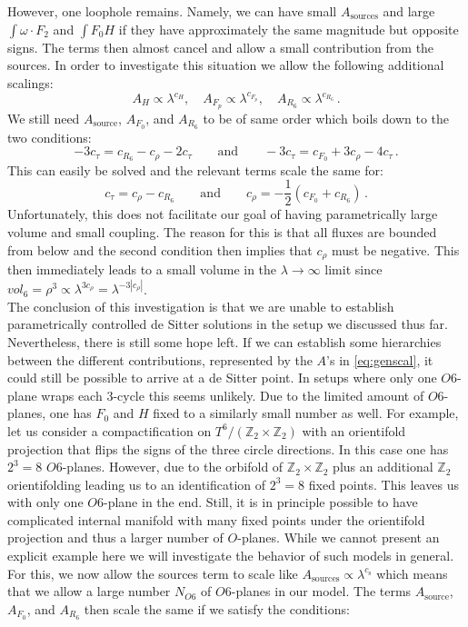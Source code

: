\documentclass[12pt]{report}
\newcommand{\be}{\begin{equation}}
\newcommand{\ee}{\end{equation}}
\begin{document}
However, one loophole remains. Namely, we can have small $A_{\text{sources}}$ and large $\int \omega \cdot F_2$ and $\int F_0 H$ if they have approximately the same magnitude but opposite signs. The terms then almost cancel and allow a small contribution from the sources. In order to investigate this situation we allow the following additional scalings:
\be 
A_H \propto \lambda^ {c_H}, \quad A_{F_p} \propto \lambda^ {c_{F_p}},\quad A_{R_6} \propto \lambda^ {c_{R_6}}\,.
\ee
We still need $A_{\text{source}}$, $A_{F_0}$, and $A_{R_6}$ to be of same order which boils down to the two conditions:
\be 
-3 c_\tau = c_{R_6} - c_\rho - 2 c_\tau \qquad \text{and} \qquad -3c_\tau = c_{F_0} + 3 c_\rho - 4 c_\tau\,.
\ee
This can easily be solved and the relevant terms scale the same for:
\be 
c_\tau = c_\rho - c_{R_6} \qquad \text{and} \qquad c_\rho = -\frac{1}{2} \left( c_{F_0} + c_{R_6} \right)\,.
\ee
Unfortunately, this does not facilitate our goal of having parametrically large volume and small coupling. The reason for this is that all fluxes are bounded from below and the second condition then implies that $c_\rho$ must be negative. This then immediately leads to a small volume in the $\lambda \to \infty$ limit since $vol_6 = \rho^ 3 \propto \lambda^ {3 c_\rho} = \lambda^ {-3 |c_\rho|}$.\\
The conclusion of this investigation is that we are unable to establish parametrically controlled de Sitter solutions in the setup we discussed thus far. Nevertheless, there is still some hope left. If we can establish some hierarchies between the different contributions, represented by the $A$'s in \eqref{eq:genscal}, it could still be possible to arrive at a de Sitter point. In setups where only one $O6$-plane wraps each 3-cycle \cite{Danielsson:2011au} this seems unlikely. Due to the limited amount of $O6$-planes, one has $F_0$ and $H$ fixed to a similarly small number as well. For example, let us consider a compactification on $T^ 6/(\mathbb{Z}_2 \times \mathbb{Z}_2)$ with an orientifold projection that flips the signs of the three circle directions. In this case one has $2^ 3 = 8$ $O6$-planes. However, due to the orbifold of $\mathbb{Z}_2 \times \mathbb{Z}_2$ plus an additional $\mathbb{Z}_2$ orientifolding leading us to an identification of $2^ 3 = 8$ fixed points. This leaves us with only one $O6$-plane in the end. Still, it is in principle possible to have complicated internal manifold with many fixed points under the orientifold projection and thus a larger number of $O$-planes. While we cannot present an explicit example here we will investigate the behavior of such models in general. For this, we now allow the sources term to scale like $A_{\text{sources}} \propto \lambda^ {c_\text{s}}$ which means that we allow a large number $N_{O6}$ of $O6$-planes in our model. The terms $A_{\text{source}}$, $A_{F_0}$, and $A_{R_6}$ then scale the same if we satisfy the conditions:
\end{document}
